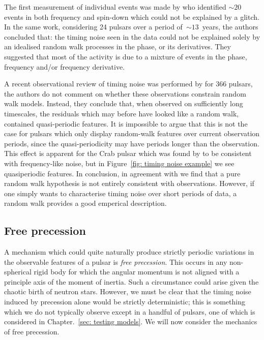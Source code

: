 The first measurement of individual events was made by \citet{Cordes1985} who
identified $\sim20$ events in both frequency and spin-down which could not be
explained by a glitch. In the same work, considering 24 pulsars over a period
of~$\sim13$~years, the authors concluded that: the timing noise seen in the
data could not be explained solely by an idealised random walk processes in the
phase, or its derivatives. They suggested that most of the activity is due to a
mixture of events in the phase, frequency and/or frequency derivative.

A recent observational review of timing noise was performed by
\citet{Hobbs2010} for 366 pulsars, the authors do not comment on whether these
observations constrain random walk models. Instead, they conclude that, when
observed on sufficiently long timescales, the residuals which may before have
looked like a random walk, contained quasi-periodic features. It is impossible
to argue that this is not the case for pulsars which only display random-walk
features over current observation periods, since the quasi-periodicity may have
periods longer than the observation. This effect is apparent for the Crab
pulsar which was found by \citet{Boynton1972} to be consistent with
frequency-like noise, but in Figure~\ref{fig: timing noise example} we
see quasiperiodic features. In conclusion, in agreement with \citet{Hobbs2010}
we find that a pure random walk hypothesis is not entirely consistent with
observations. However, if one simply wants to characterise timing noise over
short periods of data, a random walk provides a good emperical description.

\subsection{Free precession}
\label{sec: free precession}

A mechanism which could quite naturally produce strictly periodic variations in
the observable features of a pulsar is \emph{free precession}. This occurs in
any non-spherical rigid body for which the angular momentum is not aligned with a
principle axis of the moment of inertia. Such a circumstance could arise given
the chaotic birth of neutron stars. However, we must be clear that the timing noise
induced by precession alone would be strictly deterministic; this is something
which we do not typically observe except in a handful of pulsars, one of which
is considered in Chapter.~\ref{sec: testing models}. We will now
consider the mechanics of free precession.

